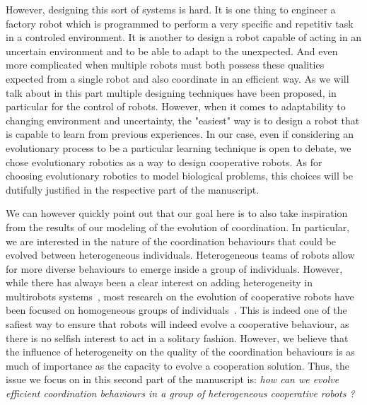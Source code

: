     However, designing this sort of systems is hard. It is one thing to engineer a factory robot which is programmed to perform a very specific and repetitiv task in a controled environment. It is another to design a robot capable of acting in an uncertain environment and to be able to adapt to the unexpected. And even more complicated when multiple robots must both possess these qualities expected from a single robot and also coordinate in an efficient way. As we will talk about in this part multiple designing techniques have been proposed, in particular for the control of robots. However, when it comes to adaptability to changing environment and uncertainty, the "easiest" way is to design a robot that is capable to learn from previous experiences. In our case, even if considering an evolutionary process to be a particular learning technique is open to debate, we chose evolutionary robotics as a way to design cooperative robots. As for choosing evolutionary robotics to model biological problems, this choices will be dutifully justified in the respective part of the manuscript. 


    We can however quickly point out that our goal here is to also take inspiration from the results of our modeling of the evolution of coordination. In particular, we are interested in the nature of the coordination behaviours that could be evolved between heterogeneous individuals. Heterogeneous teams of robots allow for more diverse behaviours to emerge inside a group of individuals. However, while there has always been a clear interest on adding heterogeneity in multirobots systems~\parencite{Parker1994, Parker2008}, most research on the evolution of cooperative robots have been focused on homogeneous groups of individuals~\parencite{Waibel2009}. This is indeed one of the safiest way to ensure that robots will indeed evolve a cooperative behaviour, as there is no selfish interest to act in a solitary fashion. However, we believe that the influence of heterogeneity on the quality of the coordination behaviours is as much of importance as the capacity to evolve a cooperation solution. Thus, the issue we focus on in this second part of the manuscript is: \emph{how can we evolve efficient coordination behaviours in a group of heterogeneous cooperative robots ?}
